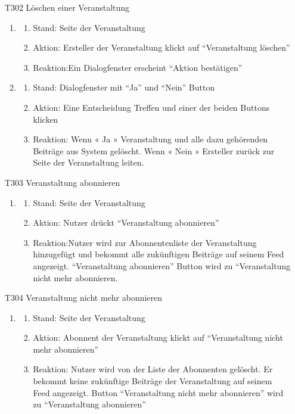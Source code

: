 \documentclass[parskip=full]{scrartcl}
\begin{document}
\begin{itemize}
		\item[T302] Löschen einer Veranstaltung
		\begin{enumerate}
			\item
			
			\begin{enumerate}[nosep]
				\item Stand: Seite der Veranstaltung
				\item Aktion: Ersteller der Veranstaltung klickt auf “Veranstaltung löschen”
				\item Reaktion:Ein Dialogfenster erscheint “Aktion bestätigen”
			\end{enumerate}
			\item
			\begin{enumerate}[nosep]	
				\item Stand: Dialogfenster mit “Ja” und “Nein” Button
				\item Aktion: Eine Entscheidung Treffen und einer der beiden Buttons klicken
				\item Reaktion: Wenn « Ja » Veranstaltung und alle dazu gehörenden Beiträge aus System gelöscht.
				Wenn  «  Nein »  Ersteller zurück zur Seite der Veranstaltung leiten.
			\end{enumerate}	
		\end{enumerate}
		
		\item[T303] Veranstaltung abonnieren
		\begin{enumerate}
			\item
			
			\begin{enumerate}[nosep]
				\item Stand: Seite der Veranstaltung
				\item Aktion: Nutzer drückt “Veranstaltung abonnieren”
				\item Reaktion:Nutzer wird zur Abonnentenliste der Veranstaltung hinzugefügt und bekommt alle zukünftigen Beiträge auf seinem Feed angezeigt. “Veranstaltung abonnieren” Button wird zu “Veranstaltung nicht mehr abonnieren.

			\end{enumerate}
		\end{enumerate}
		
		\item[T304] Veranstaltung nicht mehr abonnieren
		\begin{enumerate}
			\item
			
			\begin{enumerate}[nosep]
				\item Stand: Seite der Veranstaltung
				\item Aktion: Abonnent der Veranstaltung klickt auf “Veranstaltung nicht mehr abonnieren”
				\item Reaktion: Nutzer wird von der Liste der Abonnenten gelöscht. Er bekommt keine zukünftige Beiträge der Veranstaltung auf seinem Feed angezeigt. Button “Veranstaltung nicht mehr abonnieren” wird zu “Veranstaltung abonnieren”
			\end{enumerate}
		\end{enumerate}
		

\end{itemize}
\end{document}
